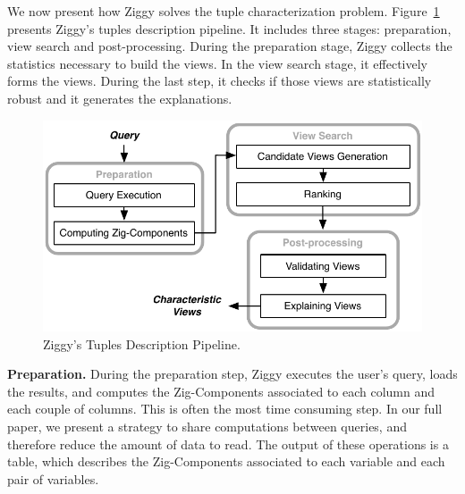 We now present how Ziggy solves the tuple characterization problem.
Figure~\ref{fig:architecture} presents Ziggy's tuples description pipeline.  It
includes three stages: preparation, view search and post-processing.
During the preparation stage, Ziggy collects the statistics necessary to build
the views. In the view search stage, it effectively forms the views.
During the last step, it checks if those views are statistically robust and it
generates the explanations.

\begin{figure}[t!]
    \centering
    \includegraphics[width=\columnwidth]{Images/Algorithm}
    \caption{Ziggy's Tuples Description Pipeline.}
    \label{fig:architecture}
\end{figure}
\textbf{Preparation.} During the preparation step, Ziggy executes the user's
query, loads the results, and computes the Zig-Components associated to each
column and each couple of columns. This is often the most time consuming step.
In our full paper, we present a strategy to share computations between queries,
and therefore reduce the amount of data to read. The output of these operations
is a table, which describes the Zig-Components associated to each variable and
each pair of variables.

